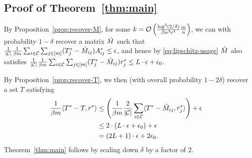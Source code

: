 \subsection{Proof of Theorem~\ref{thm:main}}
\label{thm:main-proof}

By Proposition~\ref{prop:recover-M}, for 
some $k = \mathcal{O}\left( \frac{\log^3(2/\delta)}{\beta\alpha^3\epsilon^4}{\frac{m}{n}} \right)$, 
we can with probability $1-\delta$ recover a matrix $\tilde{M}$ such that
$\frac{1}{|\mathcal{C}|}\frac{1}{\beta m}\sum_{i \in \mathcal{C}}\sum_{j \in [m]} (T^*_j - \tilde{M}_{ij})A^*_{ij} \leq \epsilon$, 
and hence by \eqref{eq:lipschitz-usage} $\tilde{M}$ also satisfies
$\frac{1}{|\mathcal{C}|}\frac{1}{\beta m}\sum_{i \in \mathcal{C}}\sum_{j \in [m]} (T^*_j - \tilde{M}_{ij})r^*_{j} \leq L \cdot \epsilon + \epsilon_0$.

By Proposition~\ref{prop:recover-T}, we then (with overall probability $1-2\delta$) recover a set $T$ satisfying
\begin{align}
\frac{1}{\beta m}\langle T^* - T, r^* \rangle &\leq \left( \frac{1}{\beta m}\frac{2}{|\mathcal{C}|}\sum_{i \in \mathcal{C}}\langle T^* - \tilde{M}_{ij}, r^*_j \rangle \right) + \epsilon \\
 &\leq 2 \cdot \left( L \cdot \epsilon + \epsilon_0 \right) + \epsilon \\
 &= (2L+1)\cdot\epsilon+2\epsilon_0.
\end{align}
Theorem~\ref{thm:main} follows by scaling down $\delta$ by a factor of $2$.
